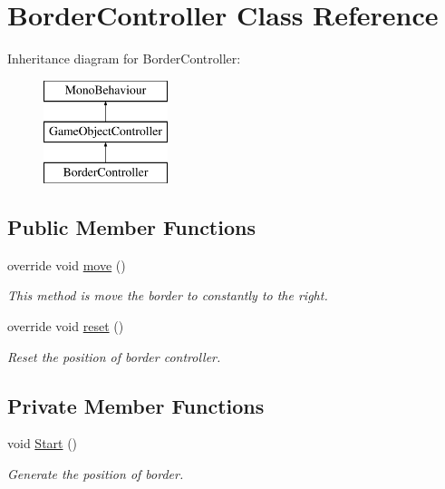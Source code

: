 \hypertarget{class_border_controller}{}\section{Border\+Controller Class Reference}
\label{class_border_controller}
Inheritance diagram for Border\+Controller\+:\begin{figure}[H]
\begin{center}
\leavevmode
\includegraphics[height=3.000000cm]{class_border_controller}
\end{center}
\end{figure}
\subsection*{Public Member Functions}
\begin{DoxyCompactItemize}
\item 
override void \hyperlink{class_border_controller_ac466a3afffc866364d246b57041c81b2}{move} ()
\begin{DoxyCompactList}\small\item\em This method is move the border to constantly to the right. \end{DoxyCompactList}\item 
override void \hyperlink{class_border_controller_a8c5ba488fa92cd7753ebce7e3a947a4e}{reset} ()
\begin{DoxyCompactList}\small\item\em Reset the position of border controller. \end{DoxyCompactList}\end{DoxyCompactItemize}
\subsection*{Private Member Functions}
\begin{DoxyCompactItemize}
\item 
void \hyperlink{class_border_controller_ac0604cefdc2b662a396263e5271dffcf}{Start} ()
\begin{DoxyCompactList}\small\item\em Generate the position of border. \end{DoxyCompactList}\end{DoxyCompactItemize}

